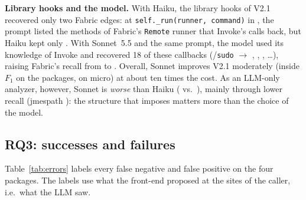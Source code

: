 \textbf{Library hooks and the model.} With Haiku, the library hooks of V2.1
recovered only two Fabric edges: at \texttt{self.\_run(runner, command)} in
, the prompt listed the methods of Fabric's
\texttt{Remote} runner that Invoke's  calls back, but Haiku
kept only . With Sonnet~5.5 and the same prompt,
the model used its knowledge of Invoke and recovered 18 of these callbacks
(/\texttt{sudo} $\rightarrow$ ,
, , \dots), raising Fabric's
recall from  to . Overall,
Sonnet improves V2.1 moderately (inside $F_1$ 
on the packages,  on micro) at about ten times
the cost. As an LLM-only analyzer, however, Sonnet is \emph{worse} than Haiku
( vs.\ ), mainly through
lower recall (jmespath ): the structure that
\nscg imposes matters more than the choice of the model.




\subsection{RQ3: successes and failures}
\label{sec:rq3}

Table~\ref{tab:errors} labels every false negative and false positive on the
four packages. The labels use what the front-end proposed at the sites of the caller, i.e.\ what the LLM saw.

\begin{table}[t]
  \caption{Error taxonomy on the four packages. FN inside: \emph{no hint} -- no
  site of the caller proposed the callee; \emph{dropped} -- proposed but
  dropped by the LLM. FN outside: \emph{misnamed} -- the tool has an outside
  callee of the same caller with the same last name component. FP inside:
  \emph{from hint} -- proposed by the front-end and kept; \emph{added} -- added
  by the LLM. FP outside: \emph{misnamed} -- the ground truth has a callee with
  the same last component.}
  \label{tab:errors}
  \small
  
\end{table}

